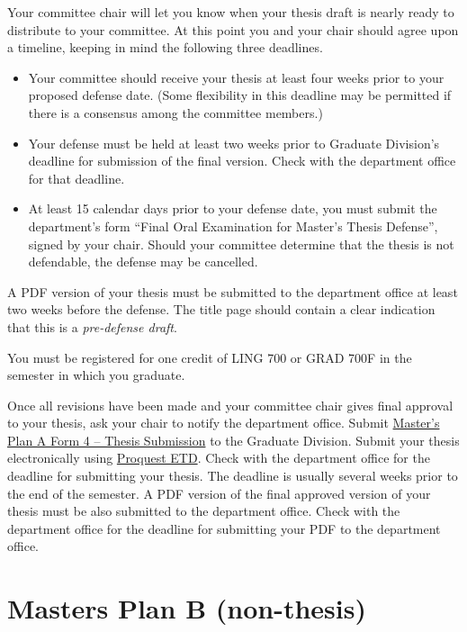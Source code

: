 \documentclass[
]{book}
\providecommand{\tightlist}{%
  \setlength{\itemsep}{0pt}\setlength{\parskip}{0pt}}
\begin{document}
Your committee chair will let you know when your thesis draft is nearly ready to distribute to your committee. At this point you and your chair should agree upon a timeline, keeping in mind the following three deadlines.

\begin{itemize}
\tightlist
\item
  Your committee should receive your thesis at least four weeks prior to your proposed defense date. (Some flexibility in this deadline may be permitted if there is a consensus among the committee members.)
\item
  Your defense must be held at least two weeks prior to Graduate Division's deadline for submission of the final version. Check with the department office for that deadline.
\item
  At least 15 calendar days prior to your defense date, you must submit the department's form ``Final Oral Examination for Master's Thesis Defense'', signed by your chair. Should your committee determine that the thesis is not defendable, the defense may be cancelled.
\end{itemize}

A PDF version of your thesis must be submitted to the department office at least two weeks before the defense. The title page should contain a clear indication that this is a \emph{pre-defense draft}.

You must be registered for one credit of LING 700 or GRAD 700F in the semester in which you graduate.

Once all revisions have been made and your committee chair gives final approval to your thesis, ask your chair to notify the department office. Submit \href{https://manoa.hawaii.edu/graduate/forms/}{Master's Plan A Form 4 -- Thesis Submission} to the Graduate Division. Submit your thesis electronically using \href{https://manoa.hawaii.edu/graduate/proquest-etd-submission-publication/}{Proquest ETD}. Check with the department office for the deadline for submitting your thesis. The deadline is usually several weeks prior to the end of the semester. A PDF version of the final approved version of your thesis must be also submitted to the department office. Check with the department office for the deadline for submitting your PDF to the department office.

\chapter{Masters Plan B (non-thesis)}\label{masters-plan-b-non-thesis}
\end{document}
